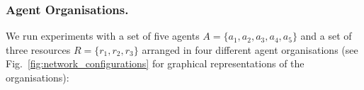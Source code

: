 \documentclass{llncs}
\begin{document}
\subsubsection{Agent Organisations.}
We run experiments with a set of five agents $A= \{ a_1,a_2,a_3,a_4,a_5 \} $ and a set of  three resources $R=\{r_1,r_2,r_3\}$ arranged in four different agent organisations (see Fig.~\ref{fig:network_configurations} for graphical representations of the organisations):
\end{document}
